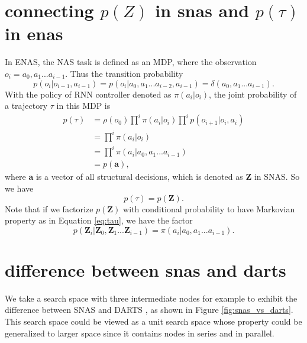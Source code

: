 \documentclass{article} \usepackage{iclr2019_conference,times}
\begin{document}
\section{connecting $p(Z)$ in snas and $p(\tau)$ in enas}
In ENAS, the NAS task is defined as an MDP, where the observation $o_{i} = {a_{0}, a_{1}... a_{i-1}}$. Thus the transition probability 
\begin{equation}
p(o_{i} | o_{i-1}, a_{i-1}) = p(o_{i} | {a_{0}, a_{1}... a_{i-2}}, a_{i-1}) = \delta ({a_{0}, a_{1}... a_{i-1}}). 
\end{equation}
With the policy of RNN controller denoted as $\pi(a_{i}|o_{i})$, the joint probability of a trajectory $\tau$ in this MDP is
\begin{equation}
\begin{split}
p(\tau) & = \rho(o_{0}) \prod ^{i} \pi (a_{i}|o_{i}) \prod^{i} p(o_{i+1} | o_{i}, a_{i}) \\
& = \prod ^{i} \pi (a_{i}|o_{i}) \\
& = \prod ^{i} \pi (a_{i}|a_{0}, a_{1}... a_{i-1}) \\
& = p (\bm{a}),
\label{eq:tau}
\end{split}
\end{equation}
where $\bm{a}$ is a vector of all structural decisions, which is denoted as $\bm{Z}$ in SNAS. So we have
\begin{equation}
p(\tau) = p(\bm{Z}). 
\end{equation}
Note that if we factorize $p(\bm{Z})$ with conditional probability to have Markovian property as in Equation \ref{eq:tau}, we have the factor 
\begin{equation}
p(\bm{Z}_{i} | \bm{Z}_{0}, \bm{Z}_{1}... \bm{Z}_{i-1})=\pi (a_{i}|a_{0}, a_{1}... a_{i-1}). 
\end{equation}

\section{difference between snas and darts}
We take a search space with three intermediate nodes for example to exhibit the difference between SNAS and DARTS \citep{liu2018darts}, as shown in Figure \ref{fig:snas_vs_darts}. This search space could be viewed as a unit search space whose property could be generalized to larger space since it contains nodes in series and in parallel. 
\end{document}
